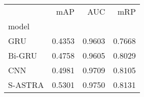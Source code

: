 \begin{tabular}{lrrr}
\toprule
{} &     mAP &     AUC &     mRP \\
model   &         &         &         \\
\midrule
GRU     &  0.4353 &  0.9603 &  0.7668 \\
Bi-GRU  &  0.4758 &  0.9605 &  0.8029 \\
CNN     &  0.4981 &  0.9709 &  0.8105 \\
S-ASTRA &  0.5301 &  0.9750 &  0.8131 \\
\bottomrule
\end{tabular}
